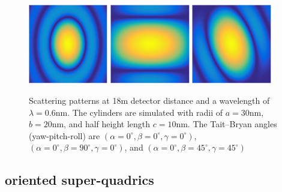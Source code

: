 \begin{figure}[htb] \includegraphics[width=0.31\textwidth]{../images/form_factor/supershapes/cylinder_0_0_0_18m.png}
\includegraphics[width=0.31\textwidth]{../images/form_factor/supershapes/cylinder_0_90_0_18m.png}   \includegraphics[width=0.31\textwidth]{../images/form_factor/supershapes/cylinder_0_45_45_18m.png}
\caption{Scattering patterns at 18m detector distance and a wavelength of $\lambda=0.6$nm. The cylinders are simulated with radii of $a=30$nm, $b=20$nm, and half height length $c=10$nm. The Tait–Bryan angles (yaw-pitch-roll) are $(\alpha=0^\circ,\beta=0^\circ,\gamma=0^\circ)$, $(\alpha=0^\circ,\beta=90^\circ,\gamma=0^\circ)$, and $(\alpha=0^\circ,\beta=45^\circ,\gamma=45^\circ)$ }
\label{fig:opo_cylinderIQ2D}
\end{figure}



\subsection{oriented super-quadrics} ~\\

